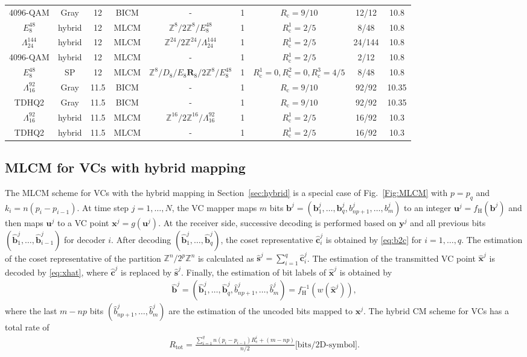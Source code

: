 \documentclass[journal]{IEEEtran}
\newcommand{\Z}{\mathbb{Z}}
\newcommand{\bb}{\boldsymbol{b}}
\newcommand{\bc}{\boldsymbol{c}}
\newcommand{\bs}{\boldsymbol{s}}
\newcommand{\bu}{\boldsymbol{u}}
\newcommand{\bx}{\boldsymbol{x}}
\newcommand{\by}{\boldsymbol{y}}
\newcommand{\bR}{\boldsymbol{R}}
\newcommand{\Rc}{R_\mathrm{c}}
\begin{document}
\begin{table}[tbp]
\begin{tabular}{c c c c c c c c c}
    4096-QAM & Gray & 12& BICM &-& 1 &$\Rc=9/10$ &12/12 & 10.8\\
    $E_8^{48}$ & hybrid & 12& MLCM &$\Z^8/2\Z^8/E_8^{48}$& 1 &$\Rc^1=2/5$ &8/48 & 10.8\\
    $\Lambda_{24}^{144}$ & hybrid & 12& MLCM &$\Z^{24}/2\Z^{24}/\Lambda_{24}^{144}$& 1 &$\Rc^1=2/5$ &24/144 & 10.8\\
    4096-QAM & hybrid & 12& MLCM &-& 1 &$\Rc^1=2/5$ &2/12 & 10.8\\
    $E_8^{48}$ & SP & 12& MLCM &$\Z^8/D_8/E_8\bR_8/2\Z^8/E_8^{48}$& 1 &$\Rc^1=0,\Rc^2=0,\Rc^3=4/5$ &8/48 & 10.8\\
    \hline 
    $\Lambda_{16}^{92}$ & Gray & 11.5& BICM & -&1 &$\Rc=9/10$ &92/92 & 10.35\\
    TDHQ2 & Gray & 11.5& BICM & -&1 &$\Rc=9/10$ &92/92 & 10.35\\
    $\Lambda_{16}^{92}$ & hybrid & 11.5& MLCM &$\Z^{16}/2\Z^{16}/\Lambda_{16}^{92}$& 1 &$\Rc^1=2/5$ &16/92 & 10.3\\
    TDHQ2 & hybrid & 11.5& MLCM &-& 1 &$\Rc^1=2/5$ &16/92 & 10.3\\
    
    \hline
  \end{tabular}
\end{table}

\subsection{MLCM for VCs with hybrid mapping}
The MLCM scheme for VCs with the hybrid mapping in Section~\ref{sec:hybrid} is a special case of Fig.~\ref{Fig:MLCM} with $p=p_q$ and $k_i=n(p_i-p_{i-1})$. At time step $j=1,\ldots,N$, the VC mapper maps $m$ bits $\bb^j=(\bb_1^j,\ldots,\bb_q^j,b_{np+1}^j,\ldots,b_m^j)$ to an integer $\bu^j =f_{\text{H}}(\bb^j)$ and then maps $\bu^j$ to a VC point $\bx^j=g(\bu^j)$. At the receiver side, successive decoding is performed based on $\by^j$ and all previous bits $(\hat{\bb}_1^j,\dots,\hat{\bb}_{i-1}^j)$ for decoder $i$. After decoding $(\hat{\bb}_1^j,\dots,\hat{\bb}_{q}^j)$, the coset representative $\hat{\bc}_i^j$ is obtained by \eqref{eq:b2c} for $i=1,\ldots,q$. The estimation of the coset representative of the partition $\Z^n/2^p\Z^n$ is calculated as $\hat{\bs}^j=\sum_{i=1}^q \hat{\bc}_i^j$. The estimation of the transmitted VC point $\hat{\bx}^j$ is decoded by \eqref{eq:xhat}, where $\hat{\bc}^j$ is replaced by $\hat{\bs}^j$. Finally, the estimation of bit labels of $\hat{\bx}^j$ is obtained by 
\begin{align}\label{eq:bhatH}
   \hat{\bb}^j=(\hat{\bb}_1^j,\ldots,\hat{\bb}_q^j,\hat{b}_{np+1}^j,\ldots,\hat{b}_m^j)= f_{\text{H}}^{-1}(w(\hat{\bx}^j)),
\end{align}
where the last $m-np$ bits $(\hat{b}_{np+1}^j,\ldots,\hat{b}_m^j)$ are the estimation of the uncoded bits mapped to $\bx^j$. The hybrid CM scheme for VCs has a total rate of
\begin{align}
    R_{\text{tot}}= \frac{\sum_{i=1}^q n(p_i-p_{i-1})\Rc^i+(m-np)}{n/2} \text{[bits/2D-symbol].}
\end{align}
\end{document}
